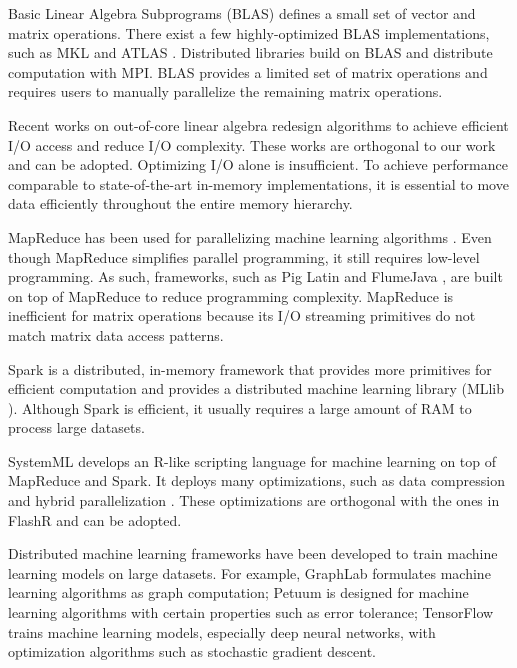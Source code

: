 Basic Linear Algebra Subprograms (BLAS) defines a small set of vector and
matrix operations. There exist a few highly-optimized BLAS implementations,
such as MKL \cite{mkl} and ATLAS \cite{atlas}. 
Distributed libraries \cite{trilinos, petsc, elemental}
build on BLAS and distribute computation with MPI.
BLAS provides a limited set of matrix operations and requires
users to manually parallelize the remaining matrix operations.

Recent works on out-of-core linear algebra \cite{Toledo99, Quintana-Orti12}
redesign algorithms to achieve efficient I/O access and reduce I/O
complexity. These works are orthogonal to our work and can be adopted.
Optimizing I/O
alone is insufficient. To achieve performance comparable to state-of-the-art
in-memory implementations, it is essential to move data efficiently throughout
the entire memory hierarchy.

MapReduce \cite{mapreduce} has been used for parallelizing machine learning
algorithms \cite{Chu06}. Even though MapReduce simplifies parallel programming,
it still requires low-level programming. As such, frameworks, such as Pig Latin
\cite{pig} and FlumeJava \cite{flumejava}, are built on top
of MapReduce to reduce programming complexity. MapReduce is inefficient for
matrix operations because
its I/O streaming primitives do not match matrix data access patterns.

Spark \cite{spark} is a distributed, in-memory framework that provides more
primitives for efficient computation and provides a distributed machine
learning library (MLlib \cite{mllib}). Although Spark is efficient, it usually
requires a large amount of RAM to process large datasets.

SystemML \cite{systemml, systemml2} develops an R-like scripting language for
machine learning on top of MapReduce and Spark. It deploys many optimizations,
such as data compression \cite{Elgohary16} and hybrid parallelization
\cite{Boehm14}. These optimizations are orthogonal with the ones in FlashR
and can be adopted.

Distributed machine learning frameworks have been developed to train machine
learning models on large datasets. For example, GraphLab \cite{graphlab}
formulates machine learning algorithms as graph computation; Petuum \cite{petuum}
is designed for machine learning algorithms with certain properties such as
error tolerance; TensorFlow \cite{tensorflow} trains machine learning models,
especially deep neural networks, with optimization algorithms such as
stochastic gradient descent.

